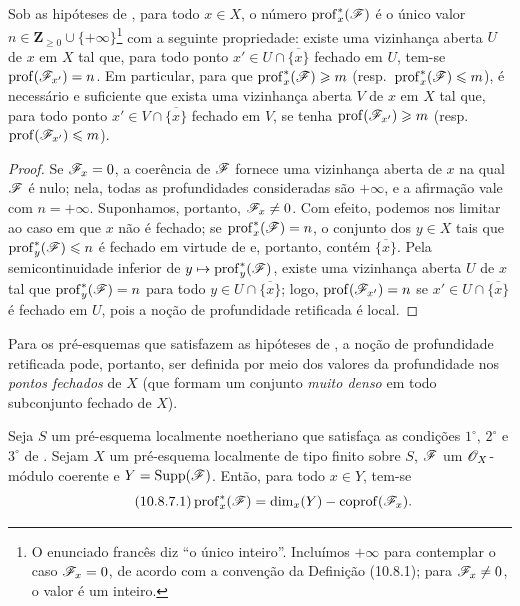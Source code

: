 \begin{corollary}[10.8.6]
\label{IV.10.8.6}
Sob as hipóteses de , para todo $x\in X$, o número $\operatorname{prof}^{*}_{x}(\mathscr{F})$ é o único valor $n\in\mathbf{Z}_{\geq0}\cup\{+\infty\}$\footnote{O enunciado francês diz ``o único inteiro''. Incluímos $+\infty$ para contemplar o caso $\mathscr{F}_x=0$, de acordo com a convenção da Definição (10.8.1); para $\mathscr{F}_x\ne0$, o valor é um inteiro.} com a seguinte propriedade: existe uma vizinhança aberta $U$ de $x$ em $X$ tal que, para todo ponto $x'\in U\cap\overline{\{x\}}$ fechado em $U$, tem-se $\operatorname{prof}(\mathscr{F}_{x'})=n$.
Em particular, para que $\operatorname{prof}^{*}_{x}(\mathscr{F})\geqslant m$ (resp.\ $\operatorname{prof}^{*}_{x}(\mathscr{F})\leqslant m$), é necessário e suficiente que exista uma vizinhança aberta $V$ de $x$ em $X$ tal que, para todo ponto $x'\in V\cap\overline{\{x\}}$ fechado em $V$, se tenha $\operatorname{prof}(\mathscr{F}_{x'})\geqslant m$ (resp.\ $\operatorname{prof}(\mathscr{F}_{x'})\leqslant m$).
\end{corollary}

\begin{proof}
Se $\mathscr{F}_x=0$, a coerência de $\mathscr{F}$ fornece uma vizinhança aberta de $x$ na qual $\mathscr{F}$ é nulo; nela, todas as profundidades consideradas são $+\infty$, e a afirmação vale com $n=+\infty$. Suponhamos, portanto, $\mathscr{F}_x\ne0$.
Com efeito, podemos nos limitar ao caso em que $x$ não é fechado; se $\operatorname{prof}^{*}_{x}(\mathscr{F})=n$, o conjunto dos $y\in X$ tais que $\operatorname{prof}^{*}_{y}(\mathscr{F})\leqslant n$ é fechado em virtude de  e, portanto, contém $\overline{\{x\}}$.
Pela semicontinuidade inferior de $y\mapsto\operatorname{prof}^{*}_{y}(\sh{F})$, existe uma vizinhança aberta $U$ de $x$ tal que $\operatorname{prof}^{*}_{y}(\mathscr{F})=n$ para todo $y\in U\cap\overline{\{x\}}$; logo, $\operatorname{prof}(\mathscr{F}_{x'})=n$ se $x'\in U\cap\overline{\{x\}}$ é fechado em $U$, pois a noção de profundidade retificada é local.
\end{proof}

Para os pré-esquemas que satisfazem as hipóteses de , a noção de profundidade retificada pode, portanto, ser definida por meio dos valores da profundidade nos \emph{pontos fechados} de $X$ (que formam um conjunto \emph{muito denso} em todo subconjunto fechado de $X$).

\begin{proposition}[10.8.7]
\label{IV.10.8.7}
Seja $S$ um pré-esquema localmente noetheriano que satisfaça as condições $1^\circ$, $2^\circ$ e $3^\circ$ de .
Sejam $X$ um pré-esquema localmente de tipo finito sobre $S$, $\mathscr{F}$ um $\mathscr{O}_X$-módulo coerente e $Y=\operatorname{Supp}(\mathscr{F})$.
Então, para todo $x\in Y$, tem-se
\begin{equation}
\label{IV.10.8.7.1}
\tag{10.8.7.1}
\operatorname{prof}^{*}_{x}(\sh{F})=\dim_x(Y)-\operatorname{coprof}(\sh{F}_x).
\end{equation}
\end{proposition}

